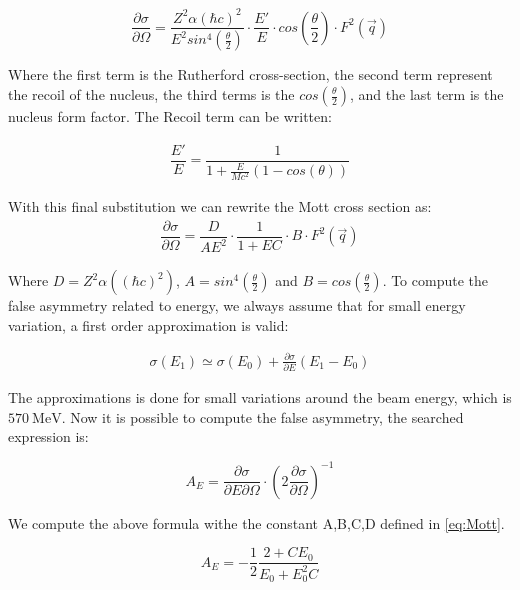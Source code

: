 \begin{equation} \label{eq:Mott}
\dfrac{\partial \sigma}{\partial \Omega} = \dfrac{Z^{2} \alpha (\hbar c)^2}{E^{2} sin^{4}(\frac{\theta}{2})} \cdot \frac{E'}{E} \cdot  cos(\frac{\theta}{2}) \cdot F^{2}(\vec{q}) 
\end{equation}

Where the first term is the Rutherford cross-section, the second term represent the recoil of the nucleus, the third terms is the $cos(\frac{\theta}{2})$, and the last term is the nucleus form factor. The Recoil term can be written:

\begin{align*}
\dfrac{E'}{E} = \dfrac{1}{1 + \frac{E}{Mc^{2}} (1 - cos(\theta))}
\end{align*}

With this final substitution we can rewrite the Mott cross section as:
\begin{align*}
\dfrac{\partial \sigma}{\partial \Omega} = \dfrac{D}{AE^{2}} \cdot \dfrac{1}{1 + EC} \cdot B \cdot F^{2}(\vec{q})
\end{align*}

Where $D = Z^{2} \alpha ((\hbar c)^2)$, $A = sin^{4}(\frac{\theta}{2})$ and $B = cos(\frac{\theta}{2})$. To compute the false asymmetry related to energy, we always assume that for small energy variation, a first order approximation is valid:

\begin{align*}
\sigma (E_{1}) \simeq \sigma(E_{0}) + \frac{\partial \sigma}{\partial E} (E_{1} - E_{0})
\end{align*}

The approximations is done for small variations around the beam energy, which is $\SI{570}{\mega \electronvolt}$.
Now it is possible to compute the false asymmetry, the searched expression is:

\begin{equation}
A_{E} = \dfrac{\partial \sigma}{\partial E \partial \Omega} \cdot  (2 \dfrac{\partial \sigma}{\partial \Omega})^{-1}
\end{equation}

We compute the above formula withe the constant A,B,C,D defined in \ref{eq:Mott}.

\begin{equation}
A_{E} = - \frac{1}{2} \dfrac{2 + CE_{0}}{E_{0} + E_{0}^{2}C} 
\end{equation}


